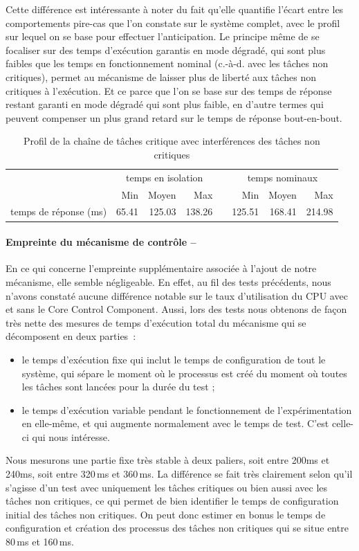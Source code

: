 \documentclass[french, a4paper, 11pt, twoside, pdftex]{StyleThese}
\begin{document}
 Cette différence est intéressante à noter du fait qu'elle quantifie l'écart entre les comportements pire-cas que l'on constate sur le système complet, avec le profil sur lequel on se base pour effectuer l'anticipation. Le principe même de se focaliser sur des temps d'exécution garantis en mode dégradé, qui sont plus faibles que les temps en fonctionnement nominal (c.-à-d. avec les tâches non critiques), permet au mécanisme de laisser plus de liberté aux tâches non critiques à l'exécution. Et ce parce que l'on se base sur des temps de réponse restant garanti en mode dégradé qui sont plus faible, en d'autre termes qui peuvent compenser un plus grand retard sur le temps de réponse bout-en-bout. 
 
\begin{table}[ht]
	\centering
	\caption{Profil de la chaîne de tâches critique avec interférences des tâches non critiques}
	\label{tab:TaskChain_nominal}
	\begin{tabular}{@{}lrrrcrrr@{}}
		\toprule
		& \multicolumn{3}{c}{temps en isolation} &\phantom&\multicolumn{3}{c}{temps nominaux} \\
		\cmidrule{2-4} \cmidrule{6-8} 
		&   Min  & Moyen &  Max   &&  Min  & Moyen & Max 		\\
		\midrule
		temps de réponse (ms) &  65.41 & 125.03 & 138.26 && 125.51 & 168.41 & 214.98  	\\
		\bottomrule
	\end{tabular}
\end{table} 

\paragraph{Empreinte du mécanisme de contrôle -- }En ce qui concerne l'empreinte supplémentaire associée à l'ajout de notre mécanisme, elle semble négligeable. En effet, au fil des tests précédents, nous n'avons constaté aucune différence notable sur le taux d'utilisation du CPU avec et sans le Core Control Component. Aussi, lors des tests nous obtenons de façon très nette des mesures de temps d'exécution total du mécanisme qui se décomposent en deux parties~: 
\begin{itemize}
	\item le temps d'exécution fixe qui inclut le temps de configuration de tout le système, qui sépare le moment où le processus est créé du moment où toutes les tâches sont lancées pour la durée du test ;
	\item le temps d'exécution variable pendant le fonctionnement de l'expérimentation en elle-même, et qui augmente normalement avec le temps de test. C'est celle-ci qui nous intéresse.
\end{itemize}
Nous mesurons une partie fixe très stable à deux paliers, soit entre 200ms et 240ms, soit entre 320\,ms et 360\,ms. La différence se fait très clairement selon qu'il s'agisse d'un test avec uniquement les tâches critiques ou bien aussi avec les tâches non critiques, ce qui permet de bien identifier le temps de configuration initial des tâches non critiques. On peut donc estimer en bonus le temps de configuration et création des processus des tâches non critiques qui se situe entre 80\,ms et 160\,ms.  
\end{document}
